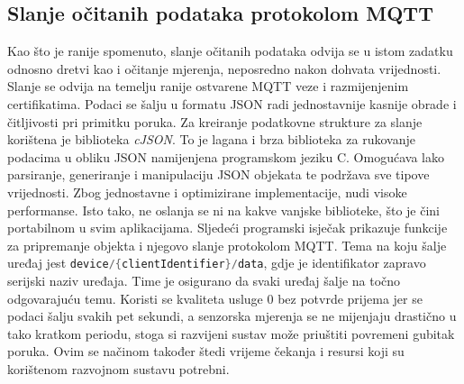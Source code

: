 \subsection{Slanje očitanih podataka protokolom MQTT}

Kao što je ranije spomenuto, slanje očitanih podataka odvija se u istom zadatku odnosno dretvi kao i očitanje mjerenja, neposredno nakon dohvata vrijednosti. Slanje se odvija na temelju ranije ostvarene MQTT veze i razmijenjenim certifikatima. Podaci se šalju u formatu JSON radi jednostavnije kasnije obrade i čitljivosti pri primitku poruka. Za kreiranje podatkovne strukture za slanje korištena je biblioteka \textit{cJSON}. To je lagana i brza biblioteka za rukovanje podacima u obliku JSON namijenjena programskom jeziku C. Omogućava lako parsiranje, generiranje i manipulaciju JSON objekata te podržava sve tipove vrijednosti. Zbog jednostavne i optimizirane implementacije, nudi visoke performanse. Isto tako, ne oslanja se ni na kakve vanjske biblioteke, što je čini portabilnom u svim aplikacijama. Sljedeći programski isječak prikazuje funkcije za pripremanje objekta i njegovo slanje protokolom MQTT. Tema na koju šalje uređaj jest \lstinline[language=c]|device/{clientIdentifier}/data|, gdje je identifikator zapravo serijski naziv uređaja. Time je osigurano da svaki uređaj šalje na točno odgovarajuću temu. Koristi se kvaliteta usluge 0  bez potvrde prijema jer se podaci šalju svakih pet sekundi, a senzorska mjerenja se ne mijenjaju drastično u tako kratkom periodu, stoga si razvijeni sustav može priuštiti povremeni gubitak poruka. Ovim se načinom također štedi vrijeme čekanja i resursi koji su korištenom razvojnom sustavu potrebni.  

